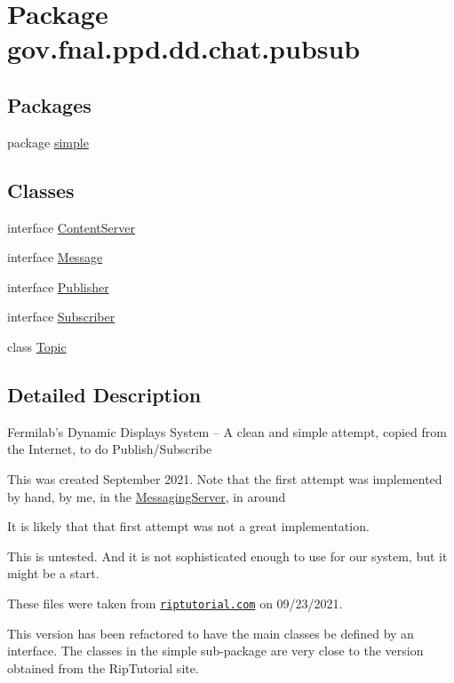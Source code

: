 \hypertarget{namespacegov_1_1fnal_1_1ppd_1_1dd_1_1chat_1_1pubsub}{\section{Package gov.\-fnal.\-ppd.\-dd.\-chat.\-pubsub}
\label{namespacegov_1_1fnal_1_1ppd_1_1dd_1_1chat_1_1pubsub}
}
\subsection*{Packages}
\begin{DoxyCompactItemize}
\item 
package \hyperlink{namespacegov_1_1fnal_1_1ppd_1_1dd_1_1chat_1_1pubsub_1_1simple}{simple}
\end{DoxyCompactItemize}
\subsection*{Classes}
\begin{DoxyCompactItemize}
\item 
interface \hyperlink{interfacegov_1_1fnal_1_1ppd_1_1dd_1_1chat_1_1pubsub_1_1ContentServer}{Content\-Server}
\item 
interface \hyperlink{interfacegov_1_1fnal_1_1ppd_1_1dd_1_1chat_1_1pubsub_1_1Message}{Message}
\item 
interface \hyperlink{interfacegov_1_1fnal_1_1ppd_1_1dd_1_1chat_1_1pubsub_1_1Publisher}{Publisher}
\item 
interface \hyperlink{interfacegov_1_1fnal_1_1ppd_1_1dd_1_1chat_1_1pubsub_1_1Subscriber}{Subscriber}
\item 
class \hyperlink{classgov_1_1fnal_1_1ppd_1_1dd_1_1chat_1_1pubsub_1_1Topic}{Topic}
\end{DoxyCompactItemize}


\subsection{Detailed Description}
Fermilab's Dynamic Displays System -- A clean and simple attempt, copied from the Internet, to do Publish/\-Subscribe 

This was created September 2021. Note that the first attempt was implemented by hand, by me, in the \hyperlink{classgov_1_1fnal_1_1ppd_1_1dd_1_1chat_1_1MessagingServer}{Messaging\-Server}, in around
\begin{DoxyEnumerate}
\item It is likely that that first attempt was not a great implementation. 
\end{DoxyEnumerate}

This is untested. And it is not sophisticated enough to use for our system, but it might be a start. 

These files were taken from \href{https://riptutorial.com/design-patterns/example/6498/publish-subscribe-in-java}{\tt riptutorial.\-com} on 09/23/2021. 

This version has been refactored to have the main classes be defined by an interface. The classes in the simple sub-\/package are very close to the version obtained from the Rip\-Tutorial site. 